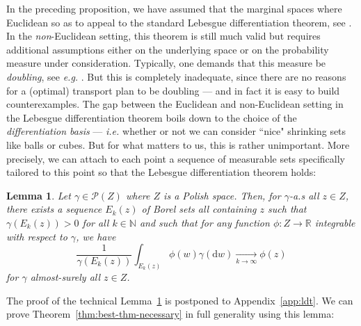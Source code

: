 \documentclass[leqno, 11pt, a4paper]{amsart}
\newtheorem{lem}{Lemma}
\theoremstyle{definition}
\newcommand{\R}{\mathbb{R}}
\newcommand{\N}{\mathbb{N}}
\newcommand{\cP}{\mathcal{P}}
\newcommand{\cto}[1]{\xrightarrow[#1]{}}
\newcommand{\dd}{\mathrm{d}}
\begin{document}
	In the preceding proposition, we have assumed that the marginal spaces where Euclidean so as to appeal to the standard Lebesgue differentiation theorem, see \cite[Theorem 8.4.6]{benedettoIntegrationModernAnalysis2009}.  In the \textit{non}-Euclidean setting, this theorem is still much valid but requires additional assumptions either on the underlying space or on the probability measure under consideration. Typically, one demands that this measure be \textit{doubling}, see \textit{e.g.} \cite[Chapter 2.9]{federerGeometricMeasureTheory1996}. But this is completely inadequate, since there are no reasons for a (optimal) transport plan to be doubling — and in fact it is easy to build counterexamples. The gap between the Euclidean and non-Euclidean setting in the Lebesgue differentiation theorem boils down to the choice of the \textit{differentiation basis} — \textit{i.e.} whether or not we can consider ``nice" shrinking sets like balls or cubes. But for what matters to us, this is rather unimportant. More precisely, we can attach to each point a sequence of measurable sets specifically tailored to this point so that the Lebesgue differentiation theorem holds:


\begin{lem}\label{lem:ldt-gen}
	Let $\gamma \in \cP(Z)$ where $Z$ is a Polish space. Then, for $\gamma$-a.s all $z \in Z$, there exists a sequence $E_k(z)$ of Borel sets all containing $z$ such that $\gamma(E_k(z)) > 0$ for all $k \in \N$ and such that for any function $\phi : Z \to \R$ integrable with respect to $\gamma$, we have 
	\begin{equation}\label{eq:ldt-non-euclidean}
		\frac{1}{\gamma(E_k(z))} \int_{E_k(z)} \phi(w)  \gamma(\dd w) \cto{k \to \infty} \phi(z)
	\end{equation}
    for $\gamma$ almost-surely all $z \in Z$.
\end{lem}
The proof of the technical Lemma~\ref{lem:ldt-gen} is postponed to Appendix~\ref{app:ldt}. We can prove Theorem~\ref{thm:best-thm-necessary} in full generality using this lemma:
\end{document}
